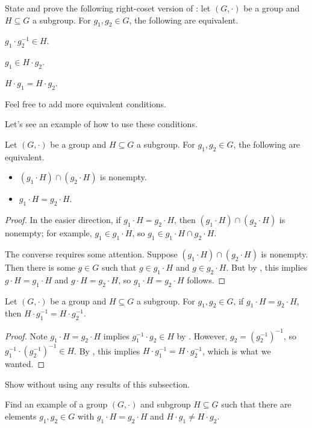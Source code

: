 \documentclass[../main.tex]{subfiles}
\begin{document}
\begin{exe} \label{exe:how-to-right-coset}
    State and prove the following right-coset version of : let $(G,\cdot)$ be a group and $H\subseteq G$ a subgroup. For $g_1,g_2\in G$, the following are equivalent.
    \begin{listalph}
        \item $g_1\cdot g_2^{-1}\in H$.
        \item $g_1\in H\cdot g_2$.
        \item $H\cdot g_1=H\cdot g_2$.
    \end{listalph}
    Feel free to add more equivalent conditions.
\end{exe}
Let's see an example of how to use these conditions.
\begin{corollary} \label{cor:intersect-cosets}
    Let $(G,\cdot)$ be a group and $H\subseteq G$ a subgroup. For $g_1,g_2\in G$, the following are equivalent.
    \begin{itemize}
        \item $(g_1\cdot H)\cap(g_2\cdot H)$ is nonempty.
        \item $g_1\cdot H=g_2\cdot H$.
    \end{itemize}
\end{corollary}
\begin{proof}
    In the easier direction, if $g_1\cdot H=g_2\cdot H$, then $(g_1\cdot H)\cap(g_2\cdot H)$ is nonempty; for example, $g_1\in g_1\cdot H$, so $g_1\in g_1\cdot H\cap g_2\cdot H$.
    
    The converse requires some attention. Suppose $(g_1\cdot H)\cap (g_2\cdot H)$ is nonempty. Then there is some $g\in G$ such that $g\in g_1\cdot H$ and $g\in g_2\cdot H$. But by , this implies $g\cdot H=g_1\cdot H$ and $g\cdot H=g_2\cdot H$, so $g_1\cdot H=g_2\cdot H$ follows.
\end{proof}
\begin{corollary} \label{cor:left-to-right-coset}
    Let $(G,\cdot)$ be a group and $H\subseteq G$ a subgroup. For $g_1,g_2\in G$, if $g_1\cdot H=g_2\cdot H$, then $H\cdot g_1^{-1}=H\cdot g_2^{-1}$.
\end{corollary}
\begin{proof}
    Note $g_1\cdot H=g_2\cdot H$ implies $g_1^{-1}\cdot g_2\in H$ by . However, $g_2=\left(g_2^{-1}\right)^{-1}$, so $g_1^{-1}\cdot\left(g_2^{-1}\right)^{-1}\in H$. By , this implies $H\cdot g_1^{-1}=H\cdot g_2^{-1}$, which is what we wanted.
\end{proof}
\begin{exe}
    Show  without using any results of this subsection.
\end{exe}
\begin{exe}
    Find an example of a group $(G,\cdot)$ and subgroup $H\subseteq G$ such that there are elements $g_1,g_2\in G$ with $g_1\cdot H=g_2\cdot H$ and $H\cdot g_1\ne H\cdot g_2$.
\end{exe}
\end{document}
